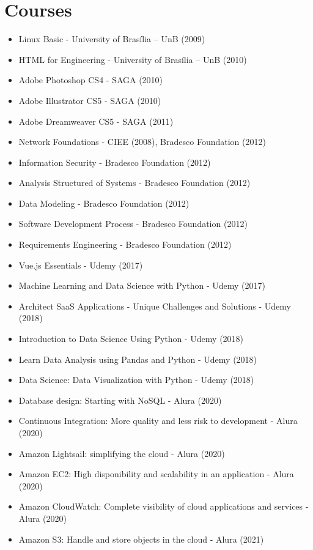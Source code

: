\section{Courses}
\begin{itemize}
    \item Linux Basic - University of Brasília – UnB (2009)
    \item HTML for Engineering - University of Brasília – UnB (2010)
    \item Adobe Photoshop CS4 - SAGA (2010)
    \item Adobe Illustrator CS5 - SAGA (2010)
    \item Adobe Dreamweaver CS5 - SAGA (2011)
    \item Network Foundations - CIEE (2008), Bradesco Foundation (2012)
    \item Information Security - Bradesco Foundation (2012)
    \item Analysis Structured of Systems - Bradesco Foundation (2012)
    \item Data Modeling - Bradesco Foundation (2012)
    \item Software Development Process - Bradesco Foundation (2012)
    \item Requirements Engineering - Bradesco Foundation (2012)
    \item Vue.js Essentials - Udemy (2017)
    \item Machine Learning and Data Science with Python - Udemy (2017)
    \item Architect SaaS Applications - Unique Challenges and Solutions - Udemy (2018)
    \item Introduction to Data Science Using Python - Udemy (2018)
    \item Learn Data Analysis using Pandas and Python - Udemy (2018)
    \item Data Science: Data Visualization with Python - Udemy (2018)
    \item Database design: Starting with NoSQL - Alura (2020)
    \item Continuous Integration: More quality and less risk to development - Alura (2020)
    \item Amazon Lightsail: simplifying the cloud - Alura (2020)
    \item Amazon EC2: High disponibility and scalability in an application - Alura (2020)
    \item Amazon CloudWatch: Complete visibility of cloud applications and services - Alura (2020)
    \item Amazon S3: Handle and store objects in the cloud - Alura (2021)

\end{itemize}

